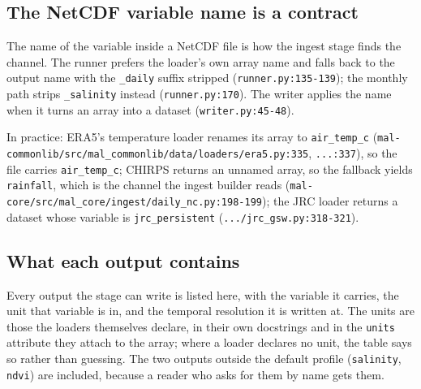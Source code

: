 \documentclass[11pt,a4paper]{article}
\newcommand{\code}[1]{\texttt{#1}}
\begin{document}
\subsection{The NetCDF variable name is a contract}

The name of the variable inside a NetCDF file is how the ingest stage finds
the channel. The runner prefers the loader's own array name and falls back to
the output name with the \code{\_daily} suffix stripped
(\code{runner.py:135-139}); the monthly path strips \code{\_salinity}
instead (\code{runner.py:170}). The writer applies the name when it turns an
array into a dataset (\code{writer.py:45-48}).

In practice: ERA5's temperature loader renames its array to
\code{air\_temp\_c}
(\code{mal-commonlib/src/mal\_commonlib/data/loaders/era5.py:335},
\code{...:337}), so the file carries \code{air\_temp\_c}; CHIRPS returns an
unnamed array, so the fallback yields \code{rainfall}, which is the channel
the ingest builder reads
(\code{mal-core/src/mal\_core/ingest/daily\_nc.py:198-199}); the JRC loader
returns a dataset whose variable is \code{jrc\_persistent}
(\code{.../jrc\_gsw.py:318-321}).

\subsection{What each output contains}
\label{sec:units}

Every output the stage can write is listed here, with the variable it
carries, the unit that variable is in, and the temporal resolution it is
written at. The units are those the loaders themselves declare, in their
own docstrings and in the \code{units} attribute they attach to the array;
where a loader declares no unit, the table says so rather than guessing.
The two outputs outside the default profile (\code{salinity}, \code{ndvi}) are
included, because a reader who asks for them by name gets them.
\end{document}
